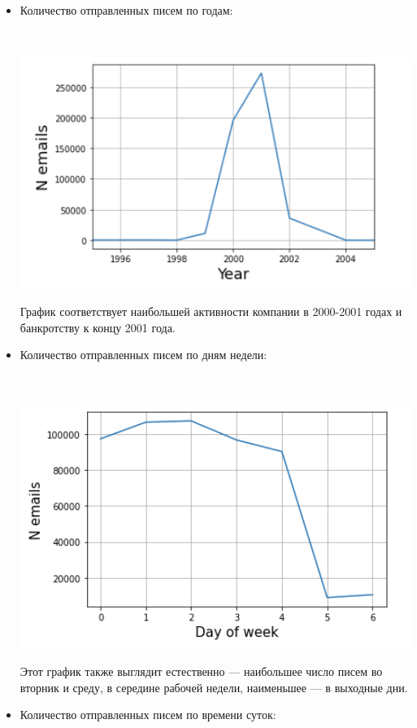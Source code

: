 \begin{itemize}

\item Количество отправленных писем по годам:

$ $

\includegraphics[scale=0.8]{pics/enron_year.png}

График соответствует наибольшей активности компании в 2000-2001 годах и банкротству к концу 2001 года.

\item Количество отправленных писем по дням недели:

$ $

\includegraphics[scale=0.8]{pics/enron_week.png}

Этот график также выглядит естественно --- наибольшее число писем во вторник и среду, в середине рабочей недели, наименьшее --- в выходные дни.

\item Количество отправленных писем по времени суток:


\end{itemize}
